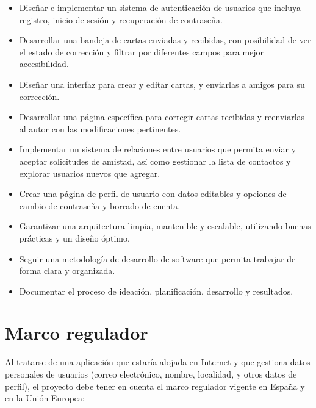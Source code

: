 \begin{itemize}
    \item Diseñar e implementar un sistema de autenticación de usuarios que incluya registro, inicio de sesión y recuperación de contraseña.
    \item Desarrollar una bandeja de cartas enviadas y recibidas, con posibilidad de ver el estado de corrección y filtrar por diferentes campos para mejor accesibilidad.
    \item Diseñar una interfaz para crear y editar cartas, y enviarlas a amigos para su corrección.
    \item Desarrollar una página específica para corregir cartas recibidas y reenviarlas al autor con las modificaciones pertinentes.
    \item Implementar un sistema de relaciones entre usuarios que permita enviar y aceptar solicitudes de amistad, así como gestionar la lista de contactos y explorar usuarios nuevos que agregar.
    \item Crear una página de perfil de usuario con datos editables y opciones de cambio de contraseña y borrado de cuenta.
    \item Garantizar una arquitectura limpia, mantenible y escalable, utilizando buenas prácticas y un diseño óptimo.
    \item Seguir una metodología de desarrollo de software que permita trabajar de forma clara y organizada.
    \item Documentar el proceso de ideación, planificación, desarrollo y resultados.
\end{itemize}

\section{Marco regulador}
Al tratarse de una aplicación que estaría alojada en Internet y que gestiona datos personales de usuarios (correo electrónico, nombre, localidad, y otros datos de perfil), el proyecto debe tener en cuenta el marco regulador vigente en España y en la Unión Europea:

